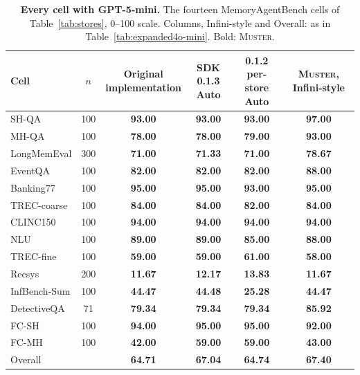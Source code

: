 \documentclass{article}
\newcommand{\tabfont}{\fontsize{7.5}{8.5}\selectfont\renewcommand{\arraystretch}{1.0}}
\newcommand{\sys}{\textsc{Muster}}
\begin{document}
\begin{table}[!htbp]
\centering\tabfont
\caption{\textbf{Every cell with GPT-5-mini.} The fourteen MemoryAgentBench cells of Table~\ref{tab:stores}, 0--100 scale. Columns, Infini-style and Overall: as in Table~\ref{tab:expanded4o-mini}. Bold: \sys{}.}
\label{tab:expanded5-mini}
\setlength{\tabcolsep}{4pt}\setlength{\aboverulesep}{0pt}\setlength{\belowrulesep}{0pt}\setlength{\extrarowheight}{0.8pt}
\begin{tabular}{lc>{\columncolor{oursbg}}c>{\columncolor{oursbg}}c>{\columncolor{oursbg}}c>{\columncolor{oursbg}}c}
\toprule
Cell & $n$ & \shortstack{\textbf{Original}\\\textbf{implementation}} & \shortstack{\textbf{SDK 0.1.3}\\\textbf{Auto}} & \shortstack{\textbf{0.1.2}\\\textbf{per-store Auto}} & \textbf{\sys{}, Infini-style} \\
\midrule
SH-QA & 100 & \textbf{93.00} & \textbf{93.00} & \textbf{93.00} & \textbf{97.00} \\
MH-QA & 100 & \textbf{78.00} & \textbf{78.00} & \textbf{79.00} & \textbf{93.00} \\
LongMemEval & 300 & \textbf{71.00} & \textbf{71.33} & \textbf{71.00} & \textbf{78.67} \\
EventQA & 100 & \textbf{82.00} & \textbf{82.00} & \textbf{82.00} & \textbf{88.00} \\
Banking77 & 100 & \textbf{95.00} & \textbf{95.00} & \textbf{93.00} & \textbf{95.00} \\
TREC-coarse & 100 & \textbf{84.00} & \textbf{84.00} & \textbf{82.00} & \textbf{84.00} \\
CLINC150 & 100 & \textbf{94.00} & \textbf{94.00} & \textbf{94.00} & \textbf{94.00} \\
NLU & 100 & \textbf{89.00} & \textbf{89.00} & \textbf{85.00} & \textbf{88.00} \\
TREC-fine & 100 & \textbf{59.00} & \textbf{59.00} & \textbf{61.00} & \textbf{58.00} \\
Recsys & 200 & \textbf{11.67} & \textbf{12.17} & \textbf{13.83} & \textbf{11.67} \\
InfBench-Sum & 100 & \textbf{44.47} & \textbf{44.48} & \textbf{25.28} & \textbf{44.47} \\
DetectiveQA & 71 & \textbf{79.34} & \textbf{79.34} & \textbf{79.34} & \textbf{85.92} \\
FC-SH & 100 & \textbf{94.00} & \textbf{95.00} & \textbf{95.00} & \textbf{92.00} \\
FC-MH & 100 & \textbf{42.00} & \textbf{59.00} & \textbf{59.00} & \textbf{43.00} \\
\midrule
Overall &  & \textbf{64.71} & \textbf{67.04} & \textbf{64.74} & \textbf{67.40} \\
\bottomrule
\end{tabular}
\end{table}
\end{document}
